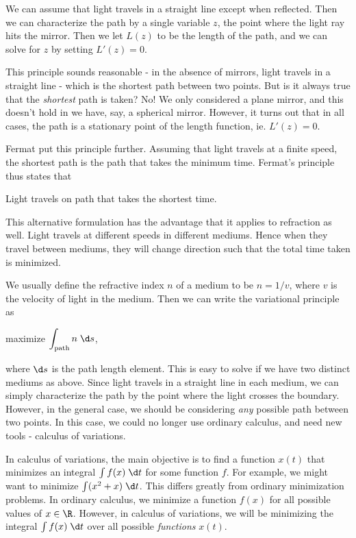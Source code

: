 \documentclass[a4paper]{article}
\begin{document}
We can assume that light travels in a straight line except when reflected. Then we can characterize the path by a single variable $z$, the point where the light ray hits the mirror. Then we let $L(z)$ to be the length of the path, and we can solve for $z$ by setting $L'(z) = 0$.

This principle sounds reasonable - in the absence of mirrors, light travels in a straight line - which is the shortest path between two points. But is it always true that the \emph{shortest} path is taken? No! We only considered a plane mirror, and this doesn't hold in we have, say, a spherical mirror. However, it turns out that in all cases, the path is a stationary point of the length function, ie. $L'(z) = 0$.

Fermat put this principle further. Assuming that light travels at a finite speed, the shortest path is the path that takes the minimum time. Fermat's principle thus states that
\begin{center}
  Light travels on path that takes the shortest time.
\end{center}
This alternative formulation has the advantage that it applies to refraction as well. Light travels at different speeds in different mediums. Hence when they travel between mediums, they will change direction such that the total time taken is minimized.

We usually define the refractive index $n$ of a medium to be $n = 1/v$, where $v$ is the velocity of light in the medium. Then we can write the variational principle as
\begin{center}
  maximize $\displaystyle \int_{\text{path}} n\;\d s$,
\end{center}
where $\d s$ is the path length element. This is easy to solve if we have two distinct mediums as above. Since light travels in a straight line in each medium, we can simply characterize the path by the point where the light crosses the boundary. However, in the general case, we should be considering \emph{any} possible path between two points. In this case, we could no longer use ordinary calculus, and need new tools - calculus of variations.

In calculus of variations, the main objective is to find a function $x(t)$ that minimizes an integral $\int f(x)\;\d t$ for some function $f$. For example, we might want to minimize $\int (x^2 + x)\;\d t$. This differs greatly from ordinary minimization problems. In ordinary calculus, we minimize a function $f(x)$ for all possible values of $x\in \R$. However, in calculus of variations, we will be minimizing the integral $\int f(x)\;\d t$ over all possible \emph{functions} $x(t)$.
\end{document}
